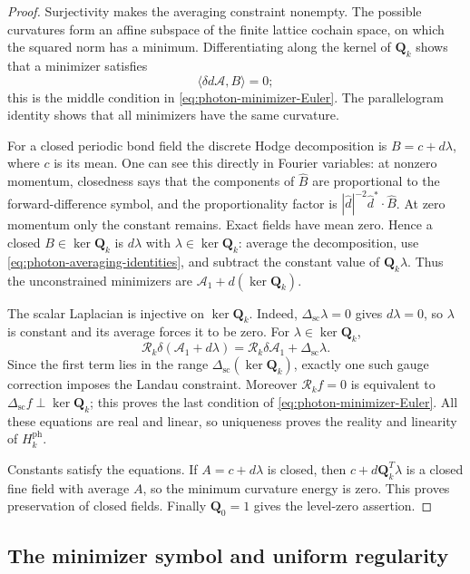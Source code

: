 \begin{proof}
Surjectivity makes the averaging constraint nonempty. The possible
curvatures form an affine subspace of the finite lattice cochain space,
on which the squared norm has a minimum.
Differentiating along the kernel of $\mathbf Q_k$ shows that a
minimizer satisfies
\[
 \langle\delta d\mathscr A,B\rangle=0;
\]
this is the middle
condition in \eqref{eq:photon-minimizer-Euler}. The parallelogram
identity shows that all minimizers have the same curvature.

For a closed periodic bond field the discrete Hodge decomposition is
$B=c+d\lambda$, where $c$ is its mean. One can see this directly in
Fourier variables: at nonzero momentum, closedness says that the
components of $\widehat B$ are proportional to the forward-difference
symbol, and the proportionality factor is
$|\widehat d|^{-2}\widehat d^*\cdot\widehat B$. At zero momentum
only the constant remains. Exact fields have mean zero. Hence a closed
$B\in\ker\mathbf Q_k$ is $d\lambda$ with
$\lambda\in\ker\mathbf Q_k$: average the decomposition, use
\eqref{eq:photon-averaging-identities}, and subtract the constant value
of $\mathbf Q_k\lambda$. Thus the unconstrained minimizers are
$\mathscr A_1+d(\ker\mathbf Q_k)$.

The scalar Laplacian is injective on $\ker\mathbf Q_k$. Indeed,
$\Delta_{\mathrm{sc}}\lambda=0$ gives $d\lambda=0$, so $\lambda$
is constant and its average forces it to be zero. For
$\lambda\in\ker\mathbf Q_k$,
\[
 \mathcal R_k\delta(\mathscr A_1+d\lambda)
       =\mathcal R_k\delta\mathscr A_1+\Delta_{\mathrm{sc}}\lambda.
\]
Since the first term lies in the range
$\Delta_{\mathrm{sc}}(\ker\mathbf Q_k)$, exactly one such gauge
correction imposes the Landau constraint. Moreover
$\mathcal R_kf=0$ is equivalent to
$\Delta_{\mathrm{sc}}f\perp\ker\mathbf Q_k$; this proves the last
condition of \eqref{eq:photon-minimizer-Euler}.
All these equations are real and linear, so uniqueness proves the
reality and linearity of $H_k^{\mathrm{ph}}$.

Constants satisfy the equations. If $A=c+d\lambda$ is closed, then
$c+d\mathbf Q_k^T\lambda$ is a closed fine field with average $A$,
so the minimum curvature energy is zero. This proves preservation of
closed fields. Finally $\mathbf Q_0=1$ gives the level-zero assertion.
\end{proof}

\subsection{The minimizer symbol and uniform regularity}
\label{subsec:photon-symbol-regularity}


